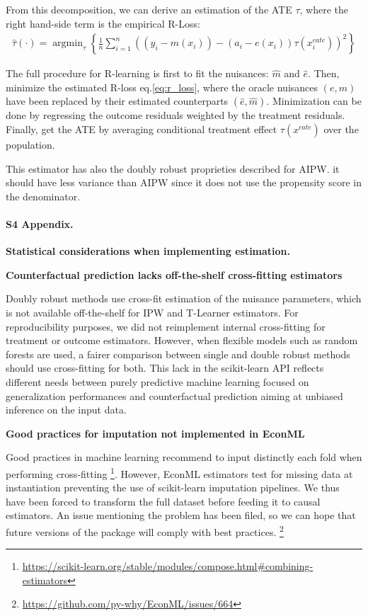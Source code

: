 \documentclass[10pt,letterpaper]{article}
\begin{document}
From this decomposition, we can derive an estimation of the ATE $\tau$, where
the right hand-side term is the empirical R-Loss:
\begin{align}\label{eq:r_loss}
  \hat{\tau}(\cdot)=\operatorname{argmin}_{\tau}\left\{\frac{1}{n} \sum_{i=1}^{n}\left(\left(y_{i}-m\left(x_{i}\right)\right)-\left(a_{i}-e(x_{i})\right) \tau\left(x^{cate}_{i}\right)\right)^{2}\right\}
\end{align}

The full procedure for R-learning is first to fit the nuisances: $\hat m$ and
$\hat e$. Then, minimize the estimated R-loss eq.\ref{eq:r_loss}, where
the oracle nuisances $(e, m)$ have been replaced by their estimated
counterparts $(\hat e, \hat m)$. Minimization can be done by regressing
the outcome residuals weighted by the treatment residuals. Finally, get
the ATE by averaging conditional treatment effect $\tau(x^{cate})$ over
the population.

This estimator has also the doubly robust proprieties described for AIPW. it
should have less variance than AIPW since it does not use the propensity score
in the denominator.
\clearpage


\paragraph*{S4 Appendix.}
\label{apd:statistical_considerations}
{\bf Statistical considerations when implementing
  estimation.}

\textbf{Counterfactual prediction lacks off-the-shelf cross-fitting estimators}

Doubly robust methods use cross-fit estimation of the nuisance parameters,
which is not available off-the-shelf for IPW and T-Learner estimators. For
reproducibility purposes, we did not reimplement internal cross-fitting for
treatment or outcome estimators. However, when flexible models such as
random forests are used, a fairer comparison between single and double
robust methods should use cross-fitting for both. This lack in the
scikit-learn API \cite{pedregosa2011scikit} reflects different needs
between purely predictive machine learning focused on generalization
performances and counterfactual prediction aiming at unbiased inference on
the input data.

\textbf{Good practices for imputation not implemented in EconML}

Good practices in machine learning recommend to input distinctly each fold
when performing cross-fitting
\footnote{\url{https://scikit-learn.org/stable/modules/compose.html\#combining-estimators}}.
However, EconML estimators test for missing data at instantiation
preventing the use of scikit-learn imputation pipelines. We thus have been
forced to transform the full dataset before feeding it to causal estimators.
An issue mentioning the problem has been filed, so we can hope that future
versions of the package will comply with best practices. \footnote{\url{https://github.com/py-why/EconML/issues/664}}
\end{document}
